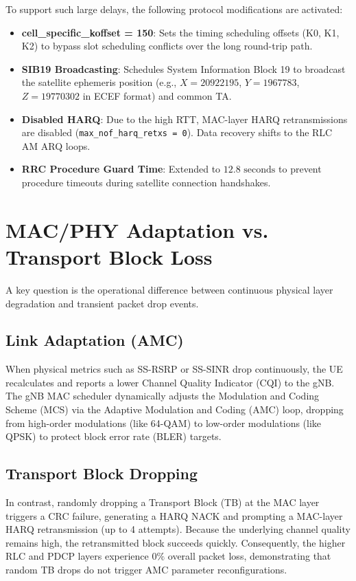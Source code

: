 \documentclass[conference]{IEEEtran}
\begin{document}
To support such large delays, the following protocol modifications are activated:
\begin{itemize}
    \item \textbf{cell\_specific\_koffset = 150}: Sets the timing scheduling offsets (K0, K1, K2) to bypass slot scheduling conflicts over the long round-trip path.
    \item \textbf{SIB19 Broadcasting}: Schedules System Information Block 19 to broadcast the satellite ephemeris position (e.g., $X=20922195$, $Y=1967783$, $Z=19770302$ in ECEF format) and common TA.
    \item \textbf{Disabled HARQ}: Due to the high RTT, MAC-layer HARQ retransmissions are disabled (\texttt{max\_nof\_harq\_retxs = 0}). Data recovery shifts to the RLC AM ARQ loops.
    \item \textbf{RRC Procedure Guard Time}: Extended to $12.8\text{ seconds}$ to prevent procedure timeouts during satellite connection handshakes.
\end{itemize}

\section{MAC/PHY Adaptation vs. Transport Block Loss}
A key question is the operational difference between continuous physical layer degradation and transient packet drop events.

\subsection{Link Adaptation (AMC)}
When physical metrics such as SS-RSRP or SS-SINR drop continuously, the UE recalculates and reports a lower Channel Quality Indicator (CQI) to the gNB. The gNB MAC scheduler dynamically adjusts the Modulation and Coding Scheme (MCS) via the Adaptive Modulation and Coding (AMC) loop, dropping from high-order modulations (like 64-QAM) to low-order modulations (like QPSK) to protect block error rate (BLER) targets.

\subsection{Transport Block Dropping}
In contrast, randomly dropping a Transport Block (TB) at the MAC layer triggers a CRC failure, generating a HARQ NACK and prompting a MAC-layer HARQ retransmission (up to 4 attempts). Because the underlying channel quality remains high, the retransmitted block succeeds quickly. Consequently, the higher RLC and PDCP layers experience $0\%$ overall packet loss, demonstrating that random TB drops do not trigger AMC parameter reconfigurations.
\end{document}

